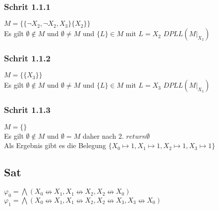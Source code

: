 \subsubsection*{Schrit 1.1.1}
$M= \{ 
\{ \neg X_2 , \neg X_2 , X_3 \}
\{  X_2 \}
 \} $\\
Es gilt $\emptyset \not \in M$ und $  \emptyset \neq M$ und $\{ L \}  \in M$ mit $L= X_2$ $DPLL(M\vert_{X_2})$ 

\subsubsection*{Schrit 1.1.2}
$M= \{ 
\{  X_3 \}
 \} $\\
Es gilt $\emptyset \not \in M$ und $  \emptyset \neq M$ und $\{ L \}  \in M$ mit $L= X_3$ $DPLL(M\vert_{X_3})$ 

\subsubsection*{Schrit 1.1.3}
$M= \{ 
 \} $\\
Es gilt $\emptyset \not \in M$ und $  \emptyset = M$ daher nach 2. $return \emptyset$\\

Als Ergebnis gibt es die Belegung $\{ X_0 \mapsto 1 , X_1 \mapsto 1 , X_2 \mapsto 1 , X_3 \mapsto 1  \}$

\subsection*{Sat}

 $\varphi_0 = \bigwedge (X_0 \nleftrightarrow X_1 , X_1 \nleftrightarrow X_2 , X_2 \nleftrightarrow X_0 )$\\


 $\varphi_1 = \bigwedge (X_0 \nleftrightarrow X_1 , X_1 \nleftrightarrow X_2 , X_2 \nleftrightarrow X_3 , X_3 \nleftrightarrow X_0 )$
